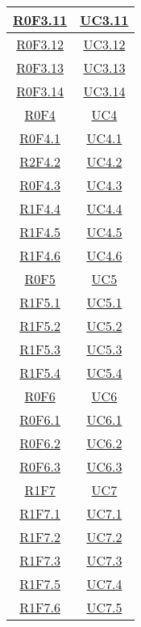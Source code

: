 \begin{longtable}{|c|c|}
\hline
\hyperlink{R0F3.11}{R0F3.11} & \hyperlink{UC3.11}{UC3.11}\\
\hline
\hyperlink{R0F3.12}{R0F3.12} & \hyperlink{UC3.12}{UC3.12}\\
\hline
\hyperlink{R0F3.13}{R0F3.13} & \hyperlink{UC3.13}{UC3.13}\\
\hline
\hyperlink{R0F3.14}{R0F3.14} & \hyperlink{UC3.14}{UC3.14}\\
\hline
\hyperlink{R0F4}{R0F4} & \hyperlink{UC4}{UC4}\\
\hline
\hyperlink{R0F4.1}{R0F4.1} & \hyperlink{UC4.1}{UC4.1}\\
\hline
\hyperlink{R2F4.2}{R2F4.2} & \hyperlink{UC4.2}{UC4.2}\\
\hline
\hyperlink{R0F4.3}{R0F4.3} & \hyperlink{UC4.3}{UC4.3}\\
\hline
\hyperlink{R1F4.4}{R1F4.4} & \hyperlink{UC4.4}{UC4.4}\\
\hline
\hyperlink{R1F4.5}{R1F4.5} & \hyperlink{UC4.5}{UC4.5}\\
\hline
\hyperlink{R1F4.6}{R1F4.6} & \hyperlink{UC4.6}{UC4.6}\\
\hline
\hyperlink{R0F5}{R0F5} & \hyperlink{UC5}{UC5}\\
\hline
\hyperlink{R1F5.1}{R1F5.1} & \hyperlink{UC5.1}{UC5.1}\\
\hline
\hyperlink{R1F5.2}{R1F5.2} & \hyperlink{UC5.2}{UC5.2}\\
\hline
\hyperlink{R1F5.3}{R1F5.3} & \hyperlink{UC5.3}{UC5.3}\\
\hline
\hyperlink{R1F5.4}{R1F5.4} & \hyperlink{UC5.4}{UC5.4}\\
\hline
\hyperlink{R0F6}{R0F6} & \hyperlink{UC6}{UC6}\\
\hline
\hyperlink{R0F6.1}{R0F6.1} & \hyperlink{UC6.1}{UC6.1}\\
\hline
\hyperlink{R0F6.2}{R0F6.2} & \hyperlink{UC6.2}{UC6.2}\\
\hline
\hyperlink{R0F6.3}{R0F6.3} & \hyperlink{UC6.3}{UC6.3}\\
\hline
\hyperlink{R1F7}{R1F7} & \hyperlink{UC7}{UC7}\\
\hline
\hyperlink{R1F7.1}{R1F7.1} & \hyperlink{UC7.1}{UC7.1}\\
\hline
\hyperlink{R1F7.2}{R1F7.2} & \hyperlink{UC7.2}{UC7.2}\\
\hline
\hyperlink{R1F7.3}{R1F7.3} & \hyperlink{UC7.3}{UC7.3}\\
\hline
\hyperlink{R1F7.5}{R1F7.5} & \hyperlink{UC7.4}{UC7.4}\\
\hline
\hyperlink{R1F7.6}{R1F7.6} & \hyperlink{UC7.5}{UC7.5}\\

\end{longtable}
